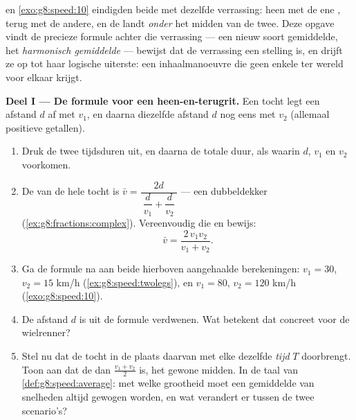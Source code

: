 \begin{problem}
\label{pb:g8:speed:1}
 en \cref{exo:g8:speed:10} eindigden beide met dezelfde
verrassing: heen met de ene , terug met de andere, en de  landt \emph{onder} het midden van de twee. Deze opgave vindt de precieze
formule achter die verrassing --- een nieuw soort gemiddelde, het
\emph{harmonisch gemiddelde} --- bewijst dat de
verrassing een stelling is, en drijft ze op tot haar logische uiterste: een
inhaalmanoeuvre die geen enkele  ter wereld voor elkaar krijgt.

\medskip
\noindent\textbf{Deel I --- De formule voor een heen-en-terugrit.}
Een tocht legt een afstand $d$ af met  $v_1$, en daarna diezelfde afstand
$d$ nog eens met  $v_2$ (allemaal positieve getallen).
\begin{enumerate}
  \item Druk de twee tijdsduren uit, en daarna de totale duur, als  waarin
        $d$, $v_1$ en $v_2$ voorkomen.
  \item De  van de hele tocht is
        $\bar v = \dfrac{2d}{\ \dfrac{d}{v_1} + \dfrac{d}{v_2}\ }$ --- een
        dubbeldekker (\cref{ex:g8:fractions:complex}). Vereenvoudig die en bewijs:
        \[
        \bar v = \frac{2\, v_1 v_2}{v_1 + v_2} .
        \]
  \item Ga de formule na aan beide hierboven aangehaalde berekeningen:
        $v_1 = 30$, $v_2 = 15$ km/h (\cref{ex:g8:speed:twolegs}), en $v_1 = 80$,
        $v_2 = 120$ km/h (\cref{exo:g8:speed:10}).
  \item De afstand $d$ is uit de formule verdwenen. Wat betekent dat concreet
        voor de wielrenner?
  \item Stel nu dat de tocht in de plaats daarvan met elke  dezelfde
        \emph{tijd} $T$ doorbrengt. Toon aan dat de  dan
        $\frac{v_1 + v_2}{2}$ is, het gewone midden. In de taal van
        \cref{def:g8:speed:average}: met welke grootheid moet een gemiddelde van
        snelheden altijd gewogen worden, en wat verandert er tussen de twee
        scenario's?
\end{enumerate}


\end{problem}
